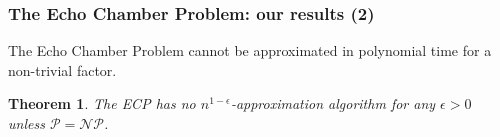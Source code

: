 \documentclass[aspectratio=169]{beamer}
\newtheorem{theorem}{Theorem}
\begin{document}
\begin{frame}[c]
	\frametitle{The Echo Chamber Problem: our results (2)}

	The Echo Chamber Problem cannot be approximated in polynomial time for a non-trivial factor.
	\begin{theorem}
		The \acrfull{ECP} has no $n^{1-\epsilon} $-approximation algorithm for
		any $\epsilon > 0$ unless $\mathcal{P} = \mathcal{NP}  $.
	\end{theorem}

\end{frame}
\end{document}
